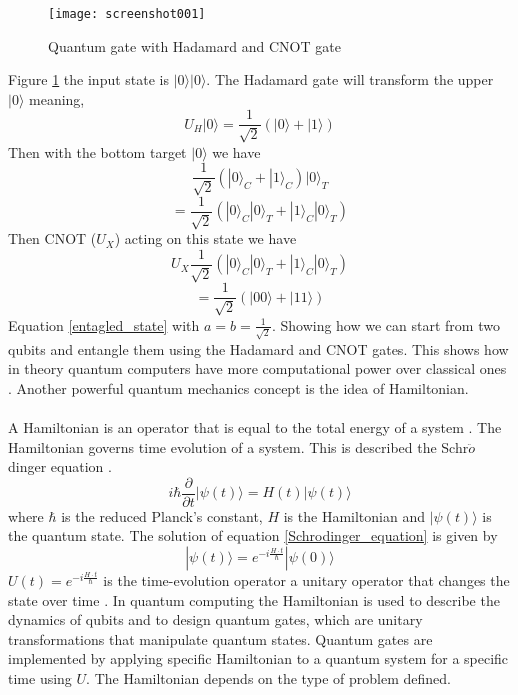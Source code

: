 \documentclass{Assignment}
\begin{document}
\begin{figure}[H]
	\centering
	\texttt{[image: screenshot001]}
	\caption{Quantum gate with Hadamard and CNOT gate}
	\label{entanglement}
\end{figure}
Figure \ref{entanglement} the input state is $|0\rangle|0\rangle$.
The Hadamard gate will transform the upper $|0\rangle$ meaning,
$$U_H|0\rangle = \frac{1}{\sqrt{2}}(|0 \rangle + |1\rangle)$$
Then with the bottom target $|0\rangle$ we have
$$\frac{1}{\sqrt{2}}(|0 \rangle_C + |1\rangle_C)|0\rangle_T$$
$$=\frac{1}{\sqrt{2}}(|0 \rangle_C|0 \rangle_T + |1\rangle_C|0 \rangle_T)$$
Then CNOT ($U_X$) acting on this state we have 
$$U_X\frac{1}{\sqrt{2}}(|0 \rangle_C|0 \rangle_T + |1\rangle_C|0 \rangle_T) $$
$$ =\frac{1}{\sqrt{2}}\left(|00\rangle + |11\rangle\right)$$
Equation \eqref{entagled_state} with $a=b = \frac{1}{\sqrt{2}}$.
Showing how we can start from two qubits and entangle them using the Hadamard and CNOT gates.
This shows how in theory quantum computers have more computational power over classical ones \cite{Deutsch1989}.
Another powerful quantum mechanics concept is the idea of Hamiltonian.
\\\\
A Hamiltonian is an operator that is equal to the total energy of a system \cite{mcintyre_quantum_2012}.
The Hamiltonian governs time evolution of a system.
This is described the Schr$\ddot{o}$dinger equation \cite{mcintyre_quantum_2012}.
\begin{equation}
	i \hbar\frac{\partial}{\partial t}|\psi(t)\rangle = H(t)|\psi(t)\rangle
	\label{Schrodinger_equation}
\end{equation}
where $\hbar$ is the reduced Planck's constant, $H$ is the Hamiltonian and $|\psi(t)\rangle$ is the quantum state.
The solution of equation \eqref{Schrodinger_equation} is given by 
\begin{equation}
	|\psi(t)\rangle = e^{-i\frac{ H\cdot t}{\hbar}}|\psi(0)\rangle
\end{equation}
$U(t)=e^{-i\frac{ H\cdot t}{\hbar}} $ is the time-evolution operator a unitary operator that changes the state over time \cite{UQS}.
In quantum computing the Hamiltonian is used to describe the dynamics of qubits and to design quantum gates, which are unitary transformations that manipulate quantum states. \cite{Deutsch1989} 
Quantum gates are implemented by applying specific Hamiltonian to a quantum system for a specific time using $U$.
The Hamiltonian depends on the type of problem defined.
\end{document}
